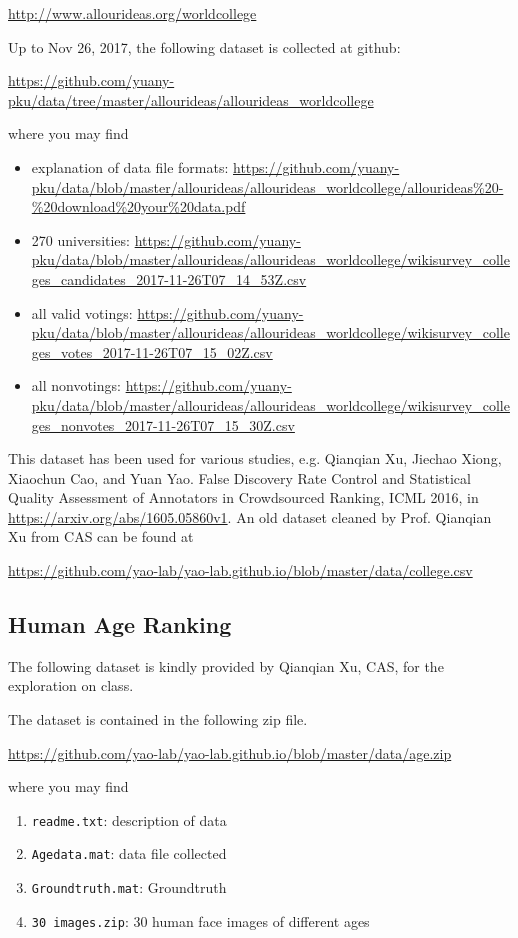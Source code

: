 \documentclass[11pt]{article}
\begin{document}
\url{http://www.allourideas.org/worldcollege}

Up to Nov 26, 2017, the following dataset is collected at github:

\url{https://github.com/yuany-pku/data/tree/master/allourideas/allourideas_worldcollege}

\noindent where you may find 

\begin{itemize}
\item explanation of data file formats: \url{https://github.com/yuany-pku/data/blob/master/allourideas/allourideas_worldcollege/allourideas%20-%20download%20your%20data.pdf}
\item 270 universities: \url{https://github.com/yuany-pku/data/blob/master/allourideas/allourideas_worldcollege/wikisurvey_colleges_candidates_2017-11-26T07_14_53Z.csv}
\item all valid votings: \url{https://github.com/yuany-pku/data/blob/master/allourideas/allourideas_worldcollege/wikisurvey_colleges_votes_2017-11-26T07_15_02Z.csv}
\item all nonvotings: \url{https://github.com/yuany-pku/data/blob/master/allourideas/allourideas_worldcollege/wikisurvey_colleges_nonvotes_2017-11-26T07_15_30Z.csv} 
\end{itemize}

This dataset has been used for various studies, e.g. Qianqian Xu, Jiechao Xiong, Xiaochun Cao, and Yuan Yao. False Discovery Rate Control and Statistical Quality Assessment of Annotators in Crowdsourced Ranking, ICML 2016, in \url{https://arxiv.org/abs/1605.05860v1}. An old dataset cleaned by Prof. Qianqian Xu from CAS can be found at

\url{https://github.com/yao-lab/yao-lab.github.io/blob/master/data/college.csv}

\subsection{Human Age Ranking}

The following dataset is kindly provided by Qianqian Xu, CAS, for the exploration on class. 

The dataset is contained in the following zip file.

\url{https://github.com/yao-lab/yao-lab.github.io/blob/master/data/age.zip}

\noindent where you may find
\begin{enumerate}
\item \texttt{readme.txt}: description of data
\item \texttt{Agedata.mat}: data file collected
\item \texttt{Groundtruth.mat}: Groundtruth
\item \texttt{30 images.zip}: 30 human face images of different ages
\end{enumerate}
\end{document}
